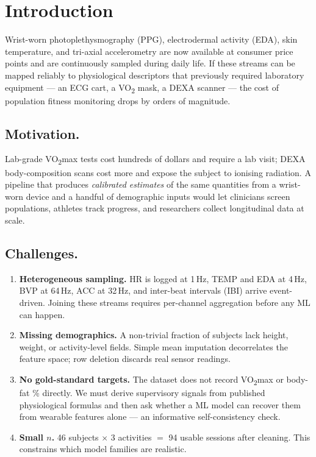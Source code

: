 \documentclass[sigconf,nonacm]{acmart}
\begin{document}
\section{Introduction}
\label{sec:intro}

Wrist-worn photoplethysmography (PPG), electrodermal activity (EDA),
skin temperature, and tri-axial accelerometry are now available at
consumer price points and are continuously sampled during daily life.
If these streams can be mapped reliably to physiological descriptors
that previously required laboratory equipment --- an ECG cart, a
VO\textsubscript{2} mask, a DEXA scanner --- the cost of population
fitness monitoring drops by orders of magnitude.

\subsection{Motivation.}
Lab-grade VO\textsubscript{2}max tests cost hundreds of dollars and
require a lab visit; DEXA body-composition scans cost more and expose
the subject to ionising radiation. A pipeline that produces
\emph{calibrated estimates} of the same quantities from a wrist-worn
device and a handful of demographic inputs would let clinicians
screen populations, athletes track progress, and researchers collect
longitudinal data at scale.

\subsection{Challenges.}
\begin{enumerate}
    \item \textbf{Heterogeneous sampling.} HR is logged at 1\,Hz,
    TEMP and EDA at 4\,Hz, BVP at 64\,Hz, ACC at 32\,Hz, and
    inter-beat intervals (IBI) arrive event-driven. Joining these
    streams requires per-channel aggregation before any ML can happen.
    \item \textbf{Missing demographics.} A non-trivial fraction of
    subjects lack height, weight, or activity-level fields. Simple
    mean imputation decorrelates the feature space; row deletion
    discards real sensor readings.
    \item \textbf{No gold-standard targets.} The dataset does not
    record VO\textsubscript{2}max or body-fat \% directly. We must
    derive supervisory signals from published physiological
    formulas and then ask whether a ML model can recover them from
    wearable features alone --- an informative self-consistency check.
    \item \textbf{Small $n$.} 46 subjects $\times$ 3 activities $=$
    94 usable sessions after cleaning. This constrains which model
    families are realistic.
\end{enumerate}
\end{document}
